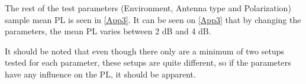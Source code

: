 The rest of the test parameters (Environment, Antenna type and Polarization) sample mean PL is seen in \autoref{App3}. It can be seen on \autoref{App3} that by changing the parameters, the mean PL varies between 2 dB and 4 dB.

\begin{table}[H]
\centering
\caption{Difference bewteen setups of different parameters.}
\label{App3}
\end{table}


It should be noted that even though there only are a minimum of two setups tested for each parameter, these setups are quite different, so if the parameters have any influence on the PL, it should be apparent. 






 

